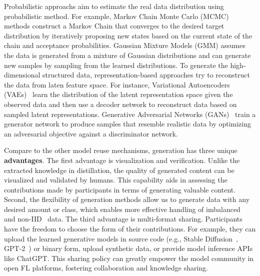 Probabilistic approachs aim to estimate the real data distribution using probabilistic method.
For example, Markov Chain Monte Carlo (MCMC)~\cite{geyer1992practical} methods construct a Markov Chain that converges to the desired target distribution by iteratively proposing new states based on the current state of the chain and acceptance probabilities.
Gaussian Mixture Models (GMM) assumes the data is generated from a mixture of Gaussian distributions and can generate new samples by sampling from the learned distributions.
To generate the high-dimensional structured data, representation-based approaches try to reconstruct the data from laten feature space.
For instance, Variational Autoencoders (VAEs)~\cite{kingma2014auto} learn the distribution of the latent representation space given the observed data and then use a decoder network to reconstruct data based on sampled latent representations.
Generative Adversarial Networks (GANs)~\cite{goodfellow2020generative} train a generator network to produce samples that resemble realistic data by optimizing an adversarial objective against a discriminator network.

Compare to the other model reuse mechanisms, generation has three unique \textbf{advantages}.
The first advantage is visualization and verification. Unlike the extracted knowledge in distillation, the quality of generated content can be visualized and validated by humans. 
This capability aids in assessing the contributions made by participants in terms of generating valuable content.
Second, the flexibility of generation methods allow us to generate data with any desired amount or class, which enables more effective handling of imbalanced~\cite{chawla2002smote} and non-IID~\cite{zhang2022fine} data.
The third advantage is multi-format sharing. Participants have the freedom to choose the form of their contributions. For example, they can upload the learned generative models in source code (e.g., Stable Diffusion~\cite{rombach2022high}, GPT-2~\cite{radford2019language}) or binary form, upload synthetic data, or provide model inference APIs like ChatGPT.
This sharing policy can greatly empower the model community in open FL platforms, fostering collaboration and knowledge sharing.

